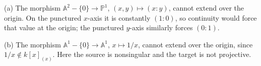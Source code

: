 (a) The morphism $\mathbb{A}^2-\{0\}\to\mathbb{P}^1$, $(x,y)\mapsto(x:y)$, cannot extend over the origin. On the punctured $x$-axis it is constantly $(1:0)$, so continuity would force that value at the origin; the punctured $y$-axis similarly forces $(0:1)$.

(b) The morphism $\mathbb{A}^1-\{0\}\to\mathbb{A}^1$, $x\mapsto1/x$, cannot extend over the origin, since $1/x\notin k[x]_{(x)}$. Here the source is nonsingular and the target is not projective.
